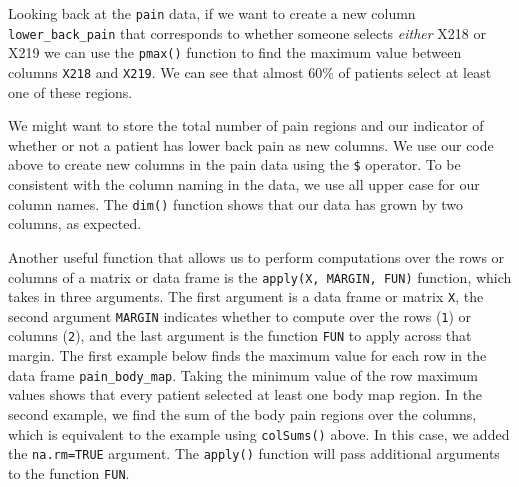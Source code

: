 \documentclass[
  letterpaper,
]{krantz}
\makeatletter
\newenvironment{Shaded}{\begin{snugshade}}{\end{snugshade}}
\newcommand{\CommentTok}[1]{\textcolor[rgb]{0.37,0.37,0.37}{#1}}
\newcommand{\FunctionTok}[1]{\textcolor[rgb]{0.28,0.35,0.67}{#1}}
\newcommand{\NormalTok}[1]{\textcolor[rgb]{0.00,0.23,0.31}{#1}}
\newcommand{\OtherTok}[1]{\textcolor[rgb]{0.00,0.23,0.31}{#1}}
\newcommand{\SpecialCharTok}[1]{\textcolor[rgb]{0.37,0.37,0.37}{#1}}
\newenvironment{kframe}{%
\medskip{}
\setlength{\fboxsep}{.8em}
 \def\at@end@of@kframe{}%
 \ifinner\ifhmode%
  \def\at@end@of@kframe{\end{minipage}}%
  \begin{minipage}{\columnwidth}%
 \fi\fi%
 \def\FrameCommand##1{\hskip\@totalleftmargin \hskip-\fboxsep
 \colorbox{shadecolor}{##1}\hskip-\fboxsep
     \hskip-\linewidth \hskip-\@totalleftmargin \hskip\columnwidth}%
 \MakeFramed {\advance\hsize-\width
   \@totalleftmargin\z@ \linewidth\hsize
   \@setminipage}}%
 {\par\unskip\endMakeFramed%
 \at@end@of@kframe}
\renewenvironment{Shaded}{\begin{kframe}}{\end{kframe}}
\makeatother
\begin{document}
Looking back at the \texttt{pain} data, if we want to create a new
column \texttt{lower\_back\_pain} that corresponds to whether someone
selects \emph{either} X218 or X219 we can use the \texttt{pmax()}
function to find the maximum value between columns \texttt{X218} and
\texttt{X219}. We can see that almost 60\% of patients select at least
one of these regions.

\begin{Shaded}
\end{Shaded}

We might want to store the total number of pain regions and our
indicator of whether or not a patient has lower back pain as new
columns. We use our code above to create new columns in the pain data
using the \texttt{\$} operator. To be consistent with the column naming
in the data, we use all upper case for our column names. The
\texttt{dim()} function shows that our data has grown by two columns, as
expected.

\begin{Shaded}
\end{Shaded}

Another useful function that allows us to perform computations over the
rows or columns of a matrix or data frame is the
\texttt{apply(X,\ MARGIN,\ FUN)} function, which takes in three
arguments. The first argument is a data frame or matrix \texttt{X}, the
second argument \texttt{MARGIN} indicates whether to compute over the
rows (\texttt{1}) or columns (\texttt{2}), and the last argument is the
function \texttt{FUN} to apply across that margin. The first example
below finds the maximum value for each row in the data frame
\texttt{pain\_body\_map}. Taking the minimum value of the row maximum
values shows that every patient selected at least one body map region.
In the second example, we find the sum of the body pain regions over the
columns, which is equivalent to the example using \texttt{colSums()}
above. In this case, we added the \texttt{na.rm=TRUE} argument. The
\texttt{apply()} function will pass additional arguments to the function
\texttt{FUN}.
\end{document}
